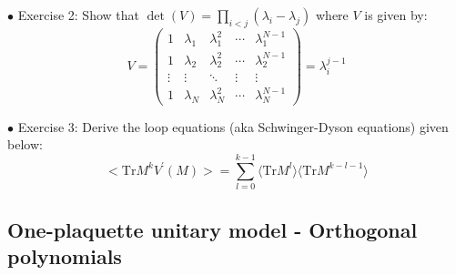 \documentclass[letter,11pt]{article}
\begin{document}
\vspace{5mm} 
\begin{mdframed}[backgroundcolor=blue!3] 
	\textsc{} 
	$\bullet$ Exercise 2: Show that $\det(V) = \prod_{i<j} (\lambda_i - \lambda_j)$ where $V$ is given by: 
	\begin{equation*}
		V = 
		\begin{pmatrix}
			1 & \lambda_1 & \lambda_{1}^{2} & \cdots & \lambda_{1}^{N-1} \\
			1 & \lambda_2 & \lambda_{2}^{2} & \cdots & \lambda_{2}^{N-1} \\ 
			\vdots  & \vdots  & \ddots & \vdots  & \vdots \\
			1 & \lambda_N & \lambda_{N}^{2} & \cdots & \lambda_{N}^{N-1} 
		\end{pmatrix} = \lambda_{i}^{j-1} 
	\end{equation*}
	
\end{mdframed} 

\begin{mdframed}[backgroundcolor=blue!3] 
	\textsc{} 
	$\bullet$ Exercise 3: Derive the loop equations (aka Schwinger-Dyson equations) given below: \\ 
	\begin{equation}
		\label{eq:LE1} 
		\Big< \mbox{Tr} M^{k} V^{\prime}(M) \Big> = \sum_{l=0}^{k-1} \langle \mbox{Tr} M^{l} \rangle  \langle \mbox{Tr} M^{k-l-1} \rangle
	\end{equation} 
\end{mdframed}

\subsection{One-plaquette unitary model - Orthogonal polynomials} 
\end{document}
